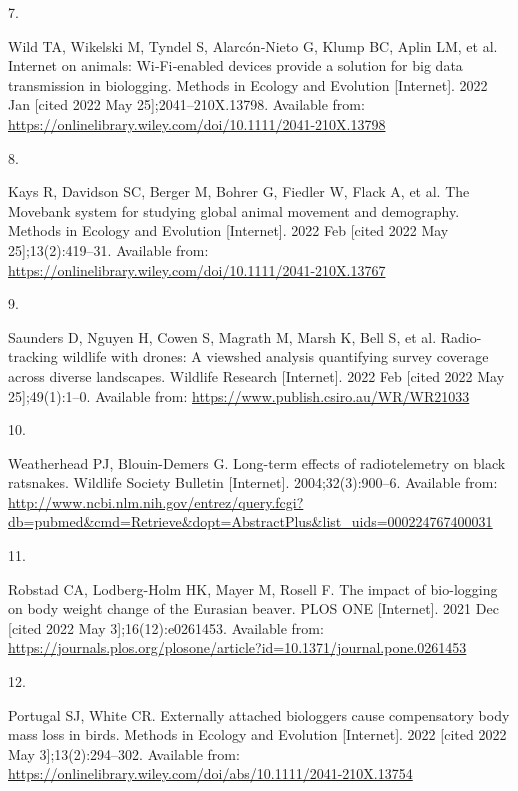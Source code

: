 \documentclass[10pt,a4paper]{article}
\newlength{\cslhangindent}
\newlength{\csllabelwidth}
\newlength{\cslentryspacingunit} %
\newenvironment{CSLReferences}[2] %
 {%
  \setlength{\parindent}{0pt}
  \ifodd #1
  \let\oldpar\par
  \def\par{\hangindent=\cslhangindent\oldpar}
  \fi
  \setlength{\parskip}{#2\cslentryspacingunit}
 }%
 {}
\newcommand{\CSLLeftMargin}[1]{\parbox[t]{\csllabelwidth}{#1}}
\newcommand{\CSLRightInline}[1]{\parbox[t]{\linewidth - \csllabelwidth}{#1}\break}
\begin{document}
\begin{CSLReferences}{0}{0}
\leavevmode{}%
\CSLLeftMargin{7. }
\CSLRightInline{Wild TA, Wikelski M, Tyndel S, Alarcón‐Nieto G, Klump BC, Aplin LM, et al. Internet on animals: {Wi}‐{Fi}‐enabled devices provide a solution for big data transmission in biologging. Methods in Ecology and Evolution {[}Internet{]}. 2022 Jan {[}cited 2022 May 25{]};2041--210X.13798. Available from: \url{https://onlinelibrary.wiley.com/doi/10.1111/2041-210X.13798}}

\leavevmode{}%
\CSLLeftMargin{8. }
\CSLRightInline{Kays R, Davidson SC, Berger M, Bohrer G, Fiedler W, Flack A, et al. The {Movebank} system for studying global animal movement and demography. Methods in Ecology and Evolution {[}Internet{]}. 2022 Feb {[}cited 2022 May 25{]};13(2):419--31. Available from: \url{https://onlinelibrary.wiley.com/doi/10.1111/2041-210X.13767}}

\leavevmode{}%
\CSLLeftMargin{9. }
\CSLRightInline{Saunders D, Nguyen H, Cowen S, Magrath M, Marsh K, Bell S, et al. Radio-tracking wildlife with drones: A viewshed analysis quantifying survey coverage across diverse landscapes. Wildlife Research {[}Internet{]}. 2022 Feb {[}cited 2022 May 25{]};49(1):1--0. Available from: \url{https://www.publish.csiro.au/WR/WR21033}}

\leavevmode{}%
\CSLLeftMargin{10. }
\CSLRightInline{Weatherhead PJ, Blouin-Demers G. Long-term effects of radiotelemetry on black ratsnakes. Wildlife Society Bulletin {[}Internet{]}. 2004;32(3):900--6. Available from: \url{http://www.ncbi.nlm.nih.gov/entrez/query.fcgi?db=pubmed\&cmd=Retrieve\&dopt=AbstractPlus\&list_uids=000224767400031}}

\leavevmode{}%
\CSLLeftMargin{11. }
\CSLRightInline{Robstad CA, Lodberg-Holm HK, Mayer M, Rosell F. The impact of bio-logging on body weight change of the {Eurasian} beaver. PLOS ONE {[}Internet{]}. 2021 Dec {[}cited 2022 May 3{]};16(12):e0261453. Available from: \url{https://journals.plos.org/plosone/article?id=10.1371/journal.pone.0261453}}

\leavevmode{}%
\CSLLeftMargin{12. }
\CSLRightInline{Portugal SJ, White CR. Externally attached biologgers cause compensatory body mass loss in birds. Methods in Ecology and Evolution {[}Internet{]}. 2022 {[}cited 2022 May 3{]};13(2):294--302. Available from: \url{https://onlinelibrary.wiley.com/doi/abs/10.1111/2041-210X.13754}}


\end{CSLReferences}
\end{document}
